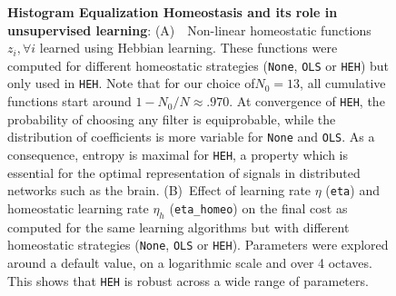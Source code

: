 \documentclass[draft]{article} %
\begin{document}
\begin{figure}[!ht]%
\caption{
{\bf Histogram Equalization Homeostasis and its role in unsupervised learning}:
{\sf (A)}~~Non-linear homeostatic functions $z_i, \forall i$ learned using Hebbian learning. These functions were computed for different homeostatic strategies (\texttt{None}, \texttt{OLS} or \texttt{HEH}) but only used in \texttt{HEH}. Note that for our choice of$N_0=13$, all cumulative functions start around $1 - N_0/N \approx .970 $. At convergence of \texttt{HEH}, the probability of choosing any filter is equiprobable, while the distribution of coefficients is more variable for \texttt{None} and \texttt{OLS}. As a consequence, entropy is maximal for \texttt{HEH}, a property which is essential for the optimal representation of signals in distributed networks such as the brain.
{\sf (B)}~Effect of learning rate $\eta$ (\texttt{eta}) and homeostatic learning rate $\eta_h$ (\texttt{eta\_homeo}) on the final cost as computed for the same learning algorithms but with different homeostatic strategies (\texttt{None}, \texttt{OLS} or \texttt{HEH}). Parameters were explored around a default value, on a logarithmic scale and over 4 octaves. This shows that \texttt{HEH} is robust across a wide range of parameters.
\label{fig:HEH}}%
\end{figure}%
\end{document}
